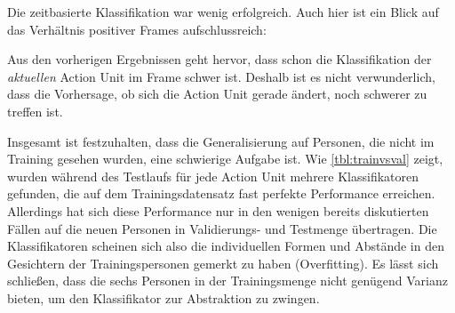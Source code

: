 Die zeitbasierte Klassifikation war wenig erfolgreich. Auch hier ist ein Blick
auf das Verhältnis positiver Frames aufschlussreich:

Aus den vorherigen Ergebnissen geht hervor, dass schon die Klassifikation der
\emph{aktuellen} Action Unit im Frame schwer ist. Deshalb ist es nicht verwunderlich,
dass die Vorhersage, ob sich die Action Unit gerade ändert, noch schwerer zu
treffen ist.

Insgesamt ist festzuhalten, dass die Generalisierung auf Personen, die nicht im
Training gesehen wurden, eine schwierige Aufgabe ist. Wie \cref{tbl:trainvsval}
zeigt, wurden während des Testlaufs für jede Action Unit mehrere Klassifikatoren
gefunden, die auf dem Trainingsdatensatz fast perfekte Performance erreichen.
Allerdings hat sich diese Performance nur in den wenigen bereits diskutierten Fällen
auf die neuen Personen in Validierungs- und Testmenge übertragen. Die
Klassifikatoren scheinen sich also die individuellen Formen und Abstände in den Gesichtern
der Trainingspersonen gemerkt zu haben (Overfitting). Es lässt sich schließen,
dass die sechs Personen in der Trainingsmenge nicht genügend Varianz bieten, um
den Klassifikator zur Abstraktion zu zwingen.



